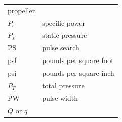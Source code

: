 \documentclass[
]{book}
\begin{document}
\begin{longtable}[]{@{}ll@{}}
\begin{minipage}[t]{0.47\columnwidth}
propeller\strut
\end{minipage}\tabularnewline
\begin{minipage}[t]{0.47\columnwidth}\raggedright
\(P_s\)\strut
\end{minipage} & \begin{minipage}[t]{0.47\columnwidth}\raggedright
specific power\strut
\end{minipage}\tabularnewline
\begin{minipage}[t]{0.47\columnwidth}\raggedright
\(P_s\)\strut
\end{minipage} & \begin{minipage}[t]{0.47\columnwidth}\raggedright
static pressure\strut
\end{minipage}\tabularnewline
\begin{minipage}[t]{0.47\columnwidth}\raggedright
PS\strut
\end{minipage} & \begin{minipage}[t]{0.47\columnwidth}\raggedright
pulse search\strut
\end{minipage}\tabularnewline
\begin{minipage}[t]{0.47\columnwidth}\raggedright
psf\strut
\end{minipage} & \begin{minipage}[t]{0.47\columnwidth}\raggedright
pounds per square foot\strut
\end{minipage}\tabularnewline
\begin{minipage}[t]{0.47\columnwidth}\raggedright
psi\strut
\end{minipage} & \begin{minipage}[t]{0.47\columnwidth}\raggedright
pounds per square inch\strut
\end{minipage}\tabularnewline
\begin{minipage}[t]{0.47\columnwidth}\raggedright
\(P_T\)\strut
\end{minipage} & \begin{minipage}[t]{0.47\columnwidth}\raggedright
total pressure\strut
\end{minipage}\tabularnewline
\begin{minipage}[t]{0.47\columnwidth}\raggedright
PW\strut
\end{minipage} & \begin{minipage}[t]{0.47\columnwidth}\raggedright
pulse width\strut
\end{minipage}\tabularnewline
\begin{minipage}[t]{0.47\columnwidth}\raggedright
\(Q\) or \(q\)\strut
\end{minipage} & \begin{minipage}[t]{0.47\columnwidth}\raggedright

\end{minipage}
\end{longtable}
\end{document}

